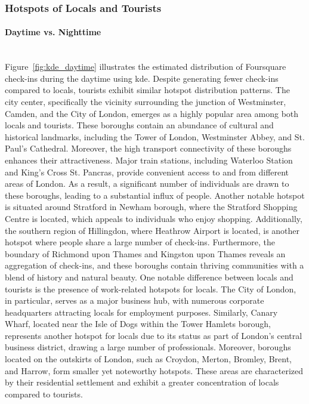 \documentclass{article}
\newcommand{\subsubsubsection}[1]{\paragraph{#1}\mbox{}\\}
\theoremstyle{definition}
\theoremstyle{remark}
\begin{document}
\subsubsection{Hotspots of Locals and Tourists} \label{hotspots}

\subsubsubsection{Daytime vs. Nighttime}
Figure~\ref{fig:kde_daytime} illustrates the estimated distribution of Foursquare check-ins during the daytime using \acrshort{kde}. Despite generating fewer check-ins compared to locals, tourists exhibit similar hotspot distribution patterns. The city center, specifically the vicinity surrounding the junction of Westminster, Camden, and the City of London, emerges as a highly popular area among both locals and tourists. These boroughs contain an abundance of cultural and historical landmarks, including the Tower of London, Westminster Abbey, and St. Paul's Cathedral. Moreover, the high transport connectivity of these boroughs enhances their attractiveness. Major train stations, including Waterloo Station and King's Cross St. Pancras, provide convenient access to and from different areas of London. As a result, a significant number of individuals are drawn to these boroughs, leading to a substantial influx of people. Another notable hotspot is situated around Stratford in Newham borough, where the Stratford Shopping Centre is located, which appeals to individuals who enjoy shopping. Additionally, the southern region of Hillingdon, where Heathrow Airport is located, is another hotspot where people share a large number of check-ins. Furthermore, the boundary of Richmond upon Thames and Kingston upon Thames reveals an aggregation of check-ins, and these boroughs contain thriving communities with a blend of history and natural beauty. One notable difference between locals and tourists is the presence of work-related hotspots for locals. The City of London, in particular, serves as a major business hub, with numerous corporate headquarters attracting locals for employment purposes. Similarly, Canary Wharf, located near the Isle of Dogs within the Tower Hamlets borough, represents another hotspot for locals due to its status as part of London's central business district, drawing a large number of professionals. Moreover, boroughs located on the outskirts of London, such as Croydon, Merton, Bromley, Brent, and Harrow, form smaller yet noteworthy hotspots. These areas are characterized by their residential settlement and exhibit a greater concentration of locals compared to tourists.
\end{document}
